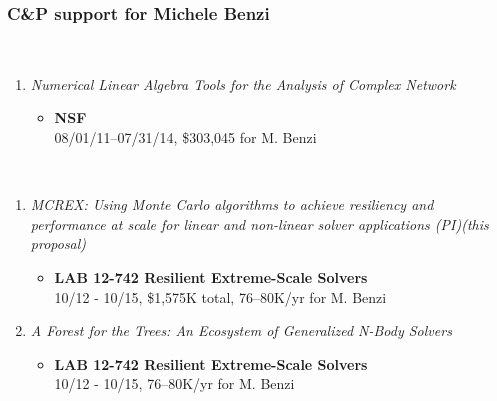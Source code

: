 
\subsubsection{C\&P support for Michele Benzi}

\\

\begin{enumerate}
  \vspace{-2ex}
  \parskip = -2pt
  
\item {\em Numerical Linear Algebra Tools for the Analysis of Complex Network}
  \begin{itemize}
  \item
    {\bf NSF}\\
    08/01/11--07/31/14, \$303,045 for M. Benzi
  \end{itemize}

\end{enumerate}


\\

\begin{enumerate}
  \vspace{-2ex}
  \parskip = -2pt

\item{\em MCREX: Using Monte Carlo algorithms to achieve resiliency 
    and performance at scale for linear and non-linear solver
    applications (PI)(this proposal)}
  \begin{itemize}
  \item {\bf LAB 12-742 Resilient Extreme-Scale Solvers}\\
    10/12 - 10/15, \$1,575K total, 76--80K/yr for M. Benzi
  \end{itemize}

\item {\em A Forest for the Trees: An Ecosystem of Generalized
    N-Body Solvers}
  \begin{itemize}
  \item {\bf LAB 12-742 Resilient Extreme-Scale Solvers}\\
    10/12 - 10/15, 76--80K/yr for M. Benzi
  \end{itemize}
\end{enumerate}


